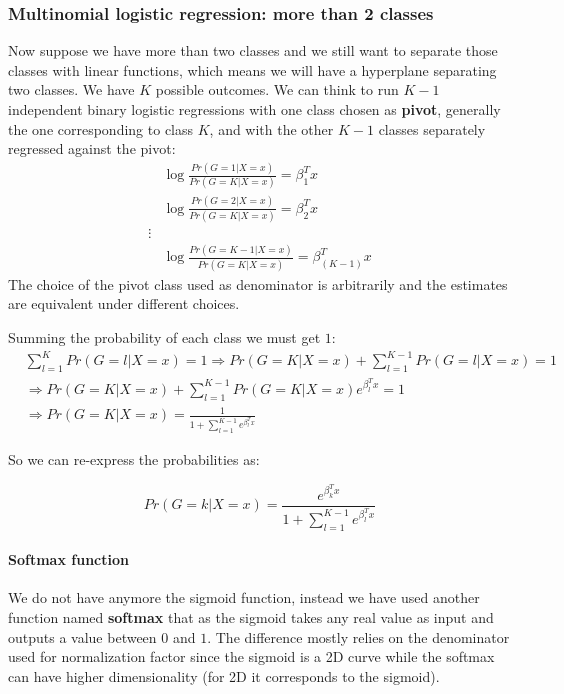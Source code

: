 \documentclass[12pt, letterpaper]{article}
\theoremstyle{definition}
\begin{document}
\subsubsection{Multinomial logistic regression: more than 2 classes}
Now suppose we have more than two classes and we still want to separate those classes with linear functions, which means we will have a hyperplane separating two classes. We have $K$ possible outcomes. We can think to run $K-1$ independent binary logistic regressions with one class chosen as \textbf{pivot}, generally the one corresponding to class $K$, and with the other $K-1$ classes separately regressed against the pivot:
\begin{equation}
\begin{aligned}
&\log \frac{Pr\left(G=1|X=x\right)}{Pr\left(G=K|X=x\right)} = \beta_1^T x \\
&\log \frac{Pr\left(G=2|X=x\right)}{Pr\left(G=K|X=x\right)} = \beta_2^T x\\
\vdots\\
&\log \frac{Pr\left(G=K-1|X=x\right)}{Pr\left(G=K|X=x\right)} = \beta_{\left(K-1\right)}^T x
\end{aligned}
\end{equation}
The choice of the pivot class used as denominator is arbitrarily and the estimates are equivalent under different choices.

Summing the probability of each class we must get $1$:
\begin{equation}
\begin{aligned}
&\sum_{l=1}^{K} Pr\left(G=l|X=x\right) = 1 \Rightarrow Pr\left(G=K|X=x\right)+ \sum_{l=1}^{K-1} Pr\left(G=l|X=x\right)=1\\
&\Rightarrow Pr\left(G=K|X=x\right) +\sum_{l=1}^{K-1} Pr\left(G=K|X=x\right)e^{\beta_l^Tx}=1\\
&\Rightarrow Pr\left(G=K|X=x\right)= \frac{1}{1+\sum_{l=1}^{K-1} e^{\beta_l^Tx}}
\end{aligned}
\end{equation}

So we can re-express the probabilities as:

\begin{equation}
Pr\left(G=k|X=x\right) = \frac{e^{\beta_{k}^T x}}{1+\sum_{l=1}^{K-1} e^{\beta_l^Tx}}
\end{equation}

\paragraph{\textbf{Softmax function}} We do not have anymore the sigmoid function, instead we have used another function named \textbf{softmax} that as the sigmoid takes any real value as input and outputs a value between $0$ and $1$. The difference mostly relies on the denominator used for normalization factor since the sigmoid is a 2D curve while the softmax can have higher dimensionality (for 2D it corresponds to the sigmoid).
\end{document}
